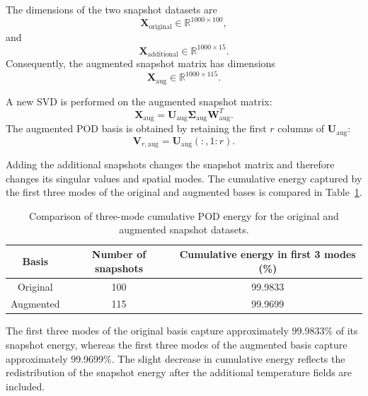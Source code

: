 The dimensions of the two snapshot datasets are
\[
\mathbf{X}_{\mathrm{original}}
\in\mathbb{R}^{1000\times100},
\]
and
\[
\mathbf{X}_{\mathrm{additional}}
\in\mathbb{R}^{1000\times15}.
\]
Consequently, the augmented snapshot matrix has
dimensions
\begin{equation}
    \boxed{
    \mathbf{X}_{\mathrm{aug}}
    \in\mathbb{R}^{1000\times115}.
    }
    \label{eq:augmented_snapshot_dimensions}
\end{equation}

A new SVD is performed on the augmented snapshot
matrix:
\begin{equation}
    \mathbf{X}_{\mathrm{aug}}
    =
    \mathbf{U}_{\mathrm{aug}}
    \mathbf{\Sigma}_{\mathrm{aug}}
    \mathbf{W}_{\mathrm{aug}}^T.
    \label{eq:augmented_svd}
\end{equation}
The augmented POD basis is obtained by retaining
the first $r$ columns of
$\mathbf{U}_{\mathrm{aug}}$:
\begin{equation}
    \boxed{
    \mathbf{V}_{r,\mathrm{aug}}
    =
    \mathbf{U}_{\mathrm{aug}}(:,1:r).
    }
    \label{eq:augmented_pod_basis}
\end{equation}

Adding the additional snapshots changes the snapshot
matrix and therefore changes its singular values
and spatial modes. The cumulative energy captured
by the first three modes of the original and
augmented bases is compared in
Table~\ref{tab:original_augmented_energy}.

\begin{table}[htbp]
    \centering
    \caption{Comparison of three-mode cumulative POD
    energy for the original and augmented snapshot datasets.}
    \label{tab:original_augmented_energy}
    \begin{tabular}{ccc}
        \toprule
        \textbf{Basis} &
        \textbf{Number of snapshots} &
        \textbf{Cumulative energy in first 3 modes (\%)} \\
        \midrule
        Original & 100 & 99.9833 \\
        Augmented & 115 & 99.9699 \\
        \bottomrule
    \end{tabular}
\end{table}

The first three modes of the original basis capture
approximately 99.9833\% of its snapshot energy,
whereas the first three modes of the augmented basis
capture approximately 99.9699\%. The slight decrease
in cumulative energy reflects the redistribution of
the snapshot energy after the additional temperature
fields are included.

